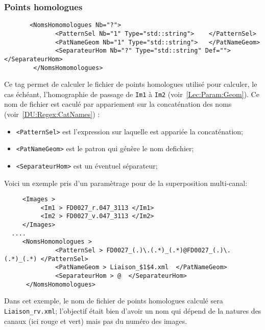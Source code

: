 

\subsubsection{Points homologues}

\begin{verbatim}
       <NomsHomomologues Nb="?">
              <PatternSel Nb="1" Type="std::string">    </PatternSel>
              <PatNameGeom Nb="1" Type="std::string">   </PatNameGeom>
              <SeparateurHom Nb="?" Type="std::string" Def="">   </SeparateurHom>
        </NomsHomomologues>

\end{verbatim}


Ce tag permet de calculer le fichier de points homologues utilis\'e
pour calculer, le cas \'ech\'eant, l'homographie de passage de 
{\tt Im1} \`a {\tt Im2} (voir~\ref{Lec:Param:Geom}). Ce nom
de fichier est cacul\'e par appariement sur la concat\'enation
des noms (voir~\ref{DU:Regex:CatNames}) :

\begin{itemize}
    \item {\tt <PatternSel>} est l'expression sur laquelle est 
         appari\'ee la concat\'enation;

    \item {\tt <PatNameGeom>} est le patron qui g\'en\`ere le nom
          defichier;
    \item {\tt <SeparateurHom>} est un \'eventuel s\'eparateur;

\end{itemize}

Voici un exemple pris d'un param\`etrage pour de la superposition
multi-canal:

\begin{verbatim}
     <Images >
          <Im1 > FD0027_r.047_3113 </Im1>
          <Im2 > FD0027_v.047_3113 </Im2>
     </Images>
  ....
     <NomsHomomologues >
              <PatternSel > FD0027_(.)\.(.*)_(.*)@FD0027_(.)\.(.*)_(.*) </PatternSel>
              <PatNameGeom > Liaison_$1$4.xml  </PatNameGeom>
              <SeparateurHom > @  </SeparateurHom>
      </NomsHomomologues>
\end{verbatim}

Dans cet exemple, le nom de fichier de points homologues 
calcul\'e sera {\tt Liaison\_rv.xml}; l'objectif \'etait
bien d'avoir un nom qui d\'epend de la natures des canaux
 (ici rouge et vert) mais pas du num\'ero des images.


